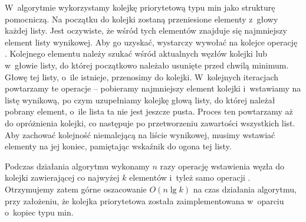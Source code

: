 \exercise %
W~algorytmie wykorzystamy kolejkę priorytetową typu min jako strukturę pomocniczą.
Na początku do kolejki zostaną przeniesione elementy z~głowy każdej listy.
Jest oczywiste, że wśród tych elementów znajduje się najmniejszy element listy wynikowej.
Aby go uzyskać, wystarczy wywołać na kolejce operację .
Kolejnego elementu należy szukać wśród aktualnych węzłów kolejki lub w~głowie listy, do której początkowo należało usunięte przed chwilą minimum.
Głowę tej listy, o~ile istnieje, przenosimy do kolejki.
W~kolejnych iteracjach powtarzamy te operacje -- pobieramy najmniejszy element kolejki i~wstawiamy na listę wynikową, po czym uzupełniamy kolejkę głową listy, do której należał pobrany element, o~ile lista ta nie jest jeszcze pusta.
Proces ten powtarzamy aż do opróżnienia kolejki, co następuje po przetworzeniu zawartości wszystkich list.
Aby zachować kolejność niemalejącą na liście wynikowej, musimy wstawiać elementy na jej koniec, pamiętając wskaźnik do ogona tej listy.

Podczas działania algorytmu wykonamy $n$ razy operację wstawienia węzła do kolejki zawierającej co najwyżej $k$ elementów i~tyleż samo operacji .
Otrzymujemy zatem górne oszacowanie $O(n\lg k)$ na czas działania algorytmu, przy założeniu, że kolejka priorytetowa została zaimplementowana w~oparciu o~kopiec typu min.
